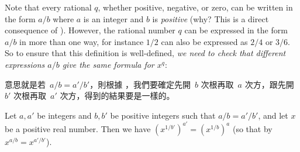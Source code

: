 \begin{note}
Note that every rational \(q\), whether positive, negative, or zero, can be written in the form \(a/b\) where \(a\) is an integer and \(b\) is \emph{positive} (why? This is a direct consequence of ).
However, the rational number \(q\) can be expressed in the form \(a/b\) in more than one way, for instance \(1/2\) can also be expressed as \(2/4\) or \(3/6\).
So to ensure that this definition is well-defined, \emph{we need to check that different expressions \(a/b\) give the same formula for \(x^q\)}:
\end{note}

\begin{note}
意思就是若\ \(a/b = a'/b'\)，則根據 ，我們要確定先開\ \(b\) 次根再取\ \(a\) 次方，跟先開\ \(b'\) 次根再取\ \(a'\) 次方，得到的結果要是一樣的。
\end{note}

\begin{lemma} \label{lem 5.6.8}
Let \(a, a'\) be integers and \(b, b'\) be positive integers such that \(a/b = a'/b'\),
and let \(x\) be a positive real number.
Then we have \((x^{1/b'})^{a'} = (x^{1/b})^a\) (so that by  \(x^{a/b} = x^{a'/b'}\)).
\end{lemma}

